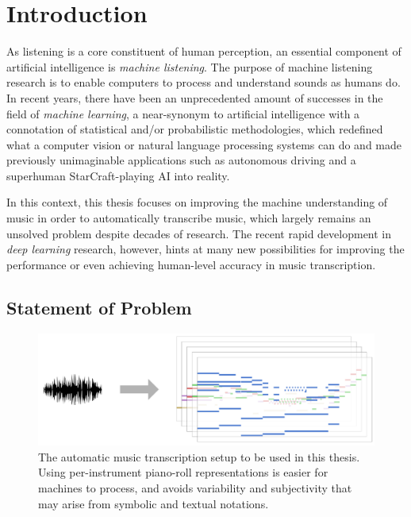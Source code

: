 
\graphicspath{{1-introduction/figures/}}

\chapter{Introduction}
\label{ch:introduction}

As listening is a core constituent of human perception, an essential component of artificial intelligence is \emph{machine listening}.
The purpose of machine listening research is to enable computers to process and understand sounds as humans do.
In recent years, there have been an unprecedented amount of successes in the field of \emph{machine learning}, a near-synonym to artificial intelligence with a connotation of statistical and/or probabilistic methodologies, which redefined what a computer vision or natural language processing systems can do and made previously unimaginable applications such as autonomous driving and a superhuman StarCraft-playing AI into reality.

In this context, this thesis focuses on improving the machine understanding of music in order to automatically transcribe music, which largely remains an unsolved problem despite decades of research.
The recent rapid development in \emph{deep learning} research, however, hints at many new possibilities for improving the performance or even achieving human-level accuracy in music transcription.

\section{Statement of Problem}\label{sec:statement}

\begin{figure}
	\includegraphics[width=\textwidth]{march-transcription.pdf}
	\caption{The automatic music transcription setup to be used in this thesis. Using per-instrument piano-roll representations is easier for machines to process, and avoids variability and subjectivity that may arise from symbolic and textual notations.} 
	\label{fig:transcription-to-piano-rolls}
\end{figure}

